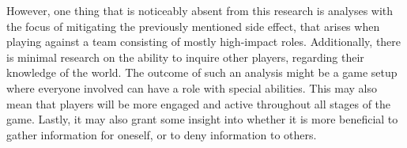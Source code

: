 However, one thing that is noticeably absent from this research is analyses
with the focus of mitigating the previously mentioned side effect, that arises
when playing against a team consisting of mostly high-impact roles.
Additionally, there is minimal research on the ability to inquire
other players, regarding their knowledge of the world. The outcome of such an
analysis might be a game setup where everyone involved can have a role with
special abilities. This may also mean that players will be more engaged and
active throughout all stages of the game. Lastly, it may also grant some
insight into whether it is more beneficial to gather information for oneself,
or to deny information to others.
